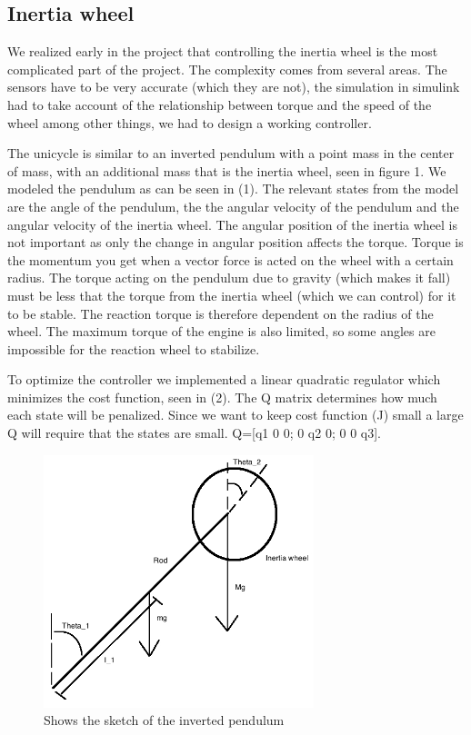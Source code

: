 \documentclass[a4paper]{article}
\begin{document}
\subsection{Inertia wheel}

We realized early in the project that controlling the inertia wheel is the most complicated part of the project. The complexity comes from several areas. The sensors have to be very accurate (which they are not), the simulation in simulink had to take account of the relationship between torque and the speed of the wheel among other things, we had to design a working controller.

The unicycle is similar to an inverted pendulum with a point mass in the center of mass, with an additional mass that is the inertia wheel, seen in figure 1. We modeled the pendulum as can be seen in (1). The relevant states from the model are the angle of the pendulum, the the angular velocity of the pendulum and the angular velocity of the inertia wheel. The angular position of the inertia wheel is not important as only the change in angular position affects the torque. Torque is the momentum you get when a vector force is acted on the wheel with a certain radius. The torque acting on the pendulum due to gravity (which makes it fall) must be less that the torque from the inertia wheel (which we can control) for it to be stable. The reaction torque is therefore dependent on the radius of the wheel. The maximum torque of the engine is also limited, so some angles are impossible for the reaction wheel to stabilize.

To optimize the controller we implemented a linear quadratic regulator which minimizes the cost function, seen in (2). The Q matrix determines how much each state will be penalized. Since we want to keep cost function (J) small a large Q will require that the states are small. Q=[q1 0 0; 0 q2 0; 0 0 q3].

\begin{figure}
	\centering
	\includegraphics[width=0.7\textwidth]{Inverted_pedulum_2}
	\caption{Shows the sketch of the inverted pendulum}
	\label{fig:sketch_inverted_pendulum}
\end{figure}
\end{document}
